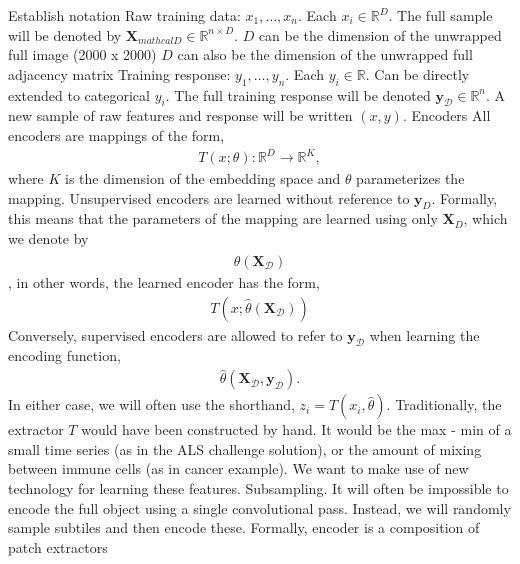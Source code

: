 \documentclass[11pt]{article}
\begin{document}
\begin{outline}
\1 Establish notation
  \2 Raw training data: $x_{1}, \dots, x_{n}$. Each $x_{i} \in \mathbb{R}^{D}$.
  The full sample will be denoted by $\mathbf{X}_{mathcal{D}} \in \mathbb{R}^{n
    \times D}$.
    \3 $D$ can be the dimension of the unwrapped full image (2000 x 2000)
    \3 $D$ can also be the dimension of the unwrapped full adjacency matrix
  \2 Training response: $y_{1}, \dots, y_{n}$. Each $y_{i} \in \mathbb{R}$. Can
  be directly extended to categorical $y_{i}$. The full training response will
  be denoted $\mathbf{y}_{\mathcal{D}} \in \mathbb{R}^{n}$.
  \2 A new sample of raw features and response will be written $\left(x,
  y\right)$.
  \3 Encoders
    \4 All encoders are mappings of the form,
      \begin{align}
        T\left(x; \theta\right): \mathbb{R}^D \to \mathbb{R}^{K},
      \end{align}
      where $K$ is the dimension of the embedding space and $\theta$
      parameterizes the mapping.
    \4 Unsupervised encoders are learned without reference to $\mathbf{y}_{D}$.
    Formally, this means that the parameters of the mapping are learned using
    only $\mathbf{X}_{D}$, which we denote by
    \begin{align}
      \hat{\theta}\left(\mathbf{X}_{\mathcal{D}}\right)
    \end{align},
    in other words, the learned encoder has the form,
    \begin{align}
      T\left(x; \hat{\theta}\left(\mathbf{X}_{\mathcal{D}}\right)\right)
    \end{align}
    \4 Conversely, supervised encoders are allowed to refer to
    $\mathbf{y}_{\mathcal{D}}$ when learning the encoding function,
    \begin{align}
      \hat{\theta}\left(\mathbf{X}_{\mathcal{D}}, \mathbf{y}_{\mathcal{D}}\right).
    \end{align}
    \4 In either case, we will often use the shorthand, $z_{i} = T\left(x_{i},
    \hat{\theta}\right)$.
    \4 Traditionally, the extractor $T$ would have been constructed by hand. It
    would be the max - min of a small time series (as in the ALS challenge
    solution), or the amount of mixing between immune cells (as in cancer
    example). We want to make use of new technology for learning these features.
    \4 Subsampling. It will often be impossible to encode the full object using
    a single convolutional pass. Instead, we will randomly sample subtiles and
    then encode these. Formally, encoder is a composition of patch extractors

\end{outline}
\end{document}
